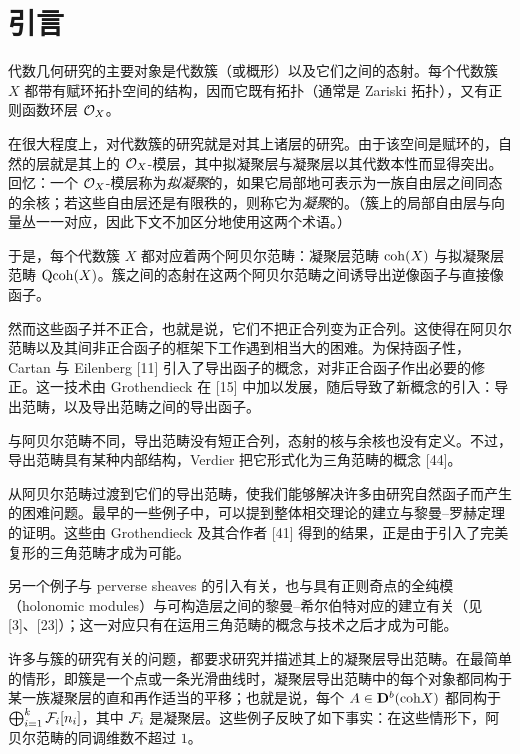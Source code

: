 \chapter*{引言}

代数几何研究的主要对象是代数簇（或概形）以及它们之间的态射。每个代数簇 $X$ 都带有赋环拓扑空间的结构，因而它既有拓扑（通常是 Zariski 拓扑），又有正则函数环层 $\mathcal{O}_X$。

在很大程度上，对代数簇的研究就是对其上诸层的研究。由于该空间是赋环的，自然的层就是其上的 $\mathcal{O}_X$-模层，其中拟凝聚层与凝聚层以其代数本性而显得突出。回忆：一个 $\mathcal{O}_X$-模层称为\emph{拟凝聚}的，如果它局部地可表示为一族自由层之间同态的余核；若这些自由层还是有限秩的，则称它为\emph{凝聚}的。（簇上的局部自由层与向量丛一一对应，因此下文不加区分地使用这两个术语。）

于是，每个代数簇 $X$ 都对应着两个阿贝尔范畴：凝聚层范畴 $\mathrm{coh}(X)$ 与拟凝聚层范畴 $\mathrm{Qcoh}(X)$。簇之间的态射在这两个阿贝尔范畴之间诱导出逆像函子与直接像函子。

然而这些函子并不正合，也就是说，它们不把正合列变为正合列。这使得在阿贝尔范畴以及其间非正合函子的框架下工作遇到相当大的困难。为保持函子性，Cartan 与 Eilenberg [11] 引入了导出函子的概念，对非正合函子作出必要的修正。这一技术由 Grothendieck 在 [15] 中加以发展，随后导致了新概念的引入：导出范畴，以及导出范畴之间的导出函子。

与阿贝尔范畴不同，导出范畴没有短正合列，态射的核与余核也没有定义。不过，导出范畴具有某种内部结构，Verdier 把它形式化为三角范畴的概念 [44]。

从阿贝尔范畴过渡到它们的导出范畴，使我们能够解决许多由研究自然函子而产生的困难问题。最早的一些例子中，可以提到整体相交理论的建立与黎曼--罗赫定理的证明。这些由 Grothendieck 及其合作者 [41] 得到的结果，正是由于引入了完美复形的三角范畴才成为可能。

另一个例子与 perverse sheaves 的引入有关，也与具有正则奇点的全纯模（holonomic modules）与可构造层之间的黎曼--希尔伯特对应的建立有关（见 [3]、[23]）；这一对应只有在运用三角范畴的概念与技术之后才成为可能。

许多与簇的研究有关的问题，都要求研究并描述其上的凝聚层导出范畴。在最简单的情形，即簇是一个点或一条光滑曲线时，凝聚层导出范畴中的每个对象都同构于某一族凝聚层的直和再作适当的平移；也就是说，每个 $A\in\mathbf{D}^{b}(\mathrm{coh} X)$ 都同构于 $\bigoplus_{i=1}^{k}\mathcal{F}_i[n_i]$，其中 $\mathcal{F}_i$ 是凝聚层。这些例子反映了如下事实：在这些情形下，阿贝尔范畴的同调维数不超过 $1$。

